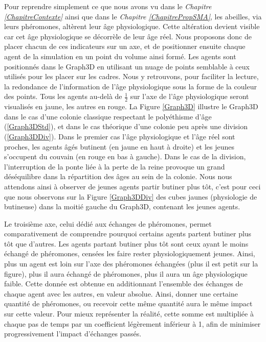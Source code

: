 		Pour reprendre simplement ce que nous avons vu dans le \textit{Chapitre \ref{ChapitreContexte}} ainsi que dans le \textit{Chapitre \ref{ChapitrePropSMA}}, les abeilles, via leurs phéromones, altèrent leur âge physiologique. Cette altération devient visible car cet âge physiologique se décorrèle de leur âge réel. Nous proposons donc de placer chacun de ces indicateurs sur un axe, et de positionner ensuite chaque agent de la simulation en un point du volume ainsi formé. Les agents sont positionnés dans le Graph3D en utilisant un nuage de points semblable à ceux utilisés pour les placer sur les cadres. Nous y retrouvons, pour faciliter la lecture, la redondance de l'information de l'âge physiologique sous la forme de la couleur des points. Tous les agents au-delà de $\frac{1}{2}$ sur l'axe de l'âge physiologique seront visualisés en jaune, les autres en rouge.
		La Figure \ref{Graph3D} illustre le Graph3D dans le cas d'une colonie classique respectant le polyéthisme d'âge (\ref{Graph3DStd}), et dans le cas théorique d'une colonie peu après une division (\ref{Graph3DDiv}). Dans le premier cas l'âge physiologique et l'âge réel sont proches, les agents âgés butinent (en jaune en haut à droite) et les jeunes s'occupent du couvain (en rouge en bas à gauche). Dans le cas de la division, l'interruption de la ponte liée à la perte de la reine provoque un grand déséquilibre dans la répartition des âges au sein de la colonie. Nous nous attendons ainsi à observer de jeunes agents partir butiner plus tôt, c'est pour ceci que nous observons sur la Figure \ref{Graph3DDiv} des cubes jaunes (physiologie de butineuse) dans la moitié gauche du Graph3D, contenant les jeunes agents.
		
		Le troisième axe, celui dédié aux échanges de phéromones, permet comparativement de comprendre pourquoi certains agents partent butiner plus tôt que d'autres. Les agents partant butiner plus tôt sont ceux ayant le moins échangé de phéromones, censées les faire rester physiologiquement jeunes. Ainsi, plus un agent est loin sur l'axe des phéromones échangées (plus il est petit sur la figure), plus il aura échangé de phéromones, plus il aura un âge physiologique faible. Cette donnée est obtenue en additionnant l'ensemble des échanges de chaque agent avec les autres, en valeur absolue. Ainsi, donner une certaine quantité de phéromones, ou recevoir cette même quantité aura le même impact sur cette valeur. Pour mieux représenter la réalité, cette somme est multipliée à chaque pas de temps par un coefficient légèrement inférieur à 1, afin de minimiser progressivement l'impact d'échanges passés.
		
